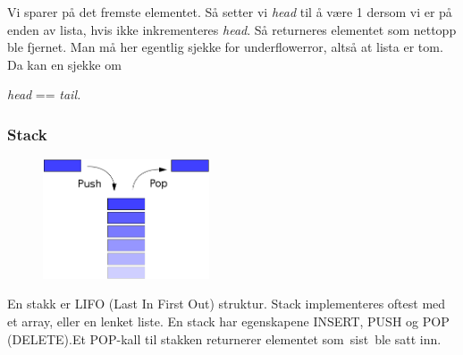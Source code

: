 \documentclass[12pt]{report}
\begin{document}
\begin{multicols}{2}

\par


\vspace{\baselineskip}
Vi sparer på det fremste elementet. Så setter vi \textit{head} til å være 1 dersom vi er på enden av lista, hvis ikke inkrementeres \textit{head}. Så returneres elementet som nettopp ble fjernet. Man må her egentlig sjekke for underflowerror, altså at lista er tom. Da kan en sjekke om \par

\textit{head} == \textit{tail.}\par


\vspace{\baselineskip}

\vspace{\baselineskip}

\end{multicols}

\vspace{\baselineskip}\subsubsection*{Stack}



\begin{figure}[H]
	\begin{Center}
		\includegraphics[width=139.2pt,height=100.15pt]{./media/image9.png}
	\end{Center}
\end{figure}



\setlength{\parskip}{0.0pt}
En stakk er LIFO (Last In First Out) struktur. Stack implementeres oftest med et array, eller en lenket liste. En stack har egenskapene INSERT, PUSH og POP (DELETE).Et POP-kall til stakken returnerer elementet som sist ble satt inn.\par
\end{document}
